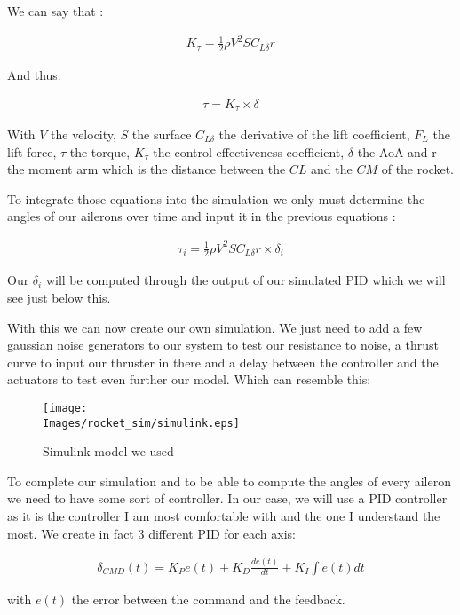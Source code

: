 We can say that :

\begin{gather*}
    K_\tau = \frac{1}{2} \rho V^2 S C_{L \delta} r
\end{gather*}

And thus:

\begin{gather*}
    \tau = K_\tau \times \delta
\end{gather*}

With $V$ the velocity, $S$ the surface $C_{L \delta}$ the derivative of the
lift coefficient, $F_L$ the lift force, $\tau$ the torque, $K_\tau$ the control
effectiveness coefficient, $\delta$ the AoA and r the moment arm which is the
distance between the $CL$ and the $CM$ of the rocket.

To integrate those equations into the simulation we only must determine the
angles of our ailerons over time and input it in the previous equations :

\begin{gather*}
    \tau_i = \frac{1}{2} \rho V^2 S C_{L \delta} r \times \delta_i
\end{gather*}

Our $\delta_i$ will be computed through the output of our simulated PID which
we will see just below this.

With this we can now create our own simulation. We just need to add a few
gaussian noise generators to our system to test our resistance to noise, a
thrust curve to input our thruster in there and a delay between the controller
and the actuators to test even further our model. Which can resemble this:

\begin{figure}[!hbt]
    \centering
    \texttt{[image: \\Images/rocket\_sim/simulink.eps]}
    \caption{Simulink model we used}
\end{figure}
\FloatBarrier

To complete our simulation and to be able to compute the angles of every
aileron we need to have some sort of controller. In our case, we will use a PID
controller as it is the controller I am most comfortable with and the one I
understand the most. We create in fact 3 different PID for each axis:

\begin{gather*}
    \delta_{CMD}(t) = K_P e(t) + K_D \frac{de(t)}{dt} + K_I \int e(t) dt
\end{gather*}

with $e(t)$ the error between the command and the feedback.

